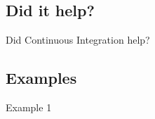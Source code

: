 \documentclass[xcolor=dvipsnames]{beamer}
\begin{document}
    \subsection{Did it help?}
      \begin{frame}{Did Continuous Integration help?}
      \end{frame}

    \subsection{Examples}
      \begin{frame}{Example 1}
      \end{frame}
\end{document}
